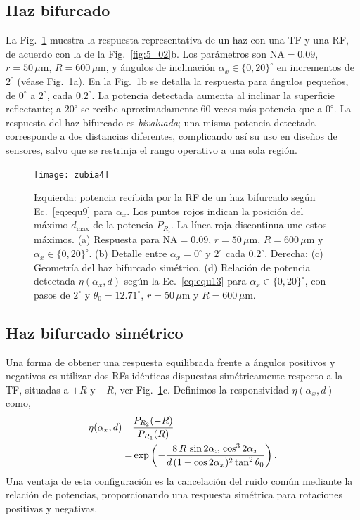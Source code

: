 \documentclass[11pt,a4paper]{article}
\begin{document}
\begin{multicols}{2}
\subsection{Haz bifurcado}\label{sec:5_02_01}
La Fig.~\ref{fig:5_04} muestra la respuesta representativa de un haz con una TF y una RF, de acuerdo con la de la Fig.~\ref{fig:5_02}b. Los parámetros son $\text{NA}=0.09$, $r=50\,\mu\text{m}$, $R=600\,\mu\text{m}$, y ángulos de inclinación $\alpha_x\in\{0,20\}^\circ$ en incrementos de $2^\circ$ (véase Fig.~\ref{fig:5_04}a). En la Fig.~\ref{fig:5_04}b se detalla la respuesta para ángulos pequeños, de $0^\circ$ a $2^\circ$, cada $0.2^\circ$.
La potencia detectada aumenta al inclinar la superficie reflectante; a $20^\circ$ se recibe aproximadamente 60 veces más potencia que a $0^\circ$. La respuesta del haz bifurcado es \emph{bivaluada}; una misma potencia detectada corresponde a dos distancias diferentes, complicando así su uso en diseños de sensores, salvo que se restrinja el rango operativo a una sola región.
\begin{figure}[t]
    \centering
    \texttt{[image: zubia4]}
    \caption{%
        Izquierda: potencia recibida por la RF de un haz bifurcado según Ec.~\eqref{eq:equ9} para $\alpha_x$. Los puntos rojos indican la posición del máximo $d_{\text{max}}$ de la potencia $P_{R_i}$. La línea roja discontinua une estos máximos. (a) Respuesta para $\text{NA}=0.09$, $r=50\,\mu$m, $R=600\,\mu$m y $\alpha_x\in\{0,20\}^\circ$. (b) Detalle entre $\alpha_x=0^\circ$ y $2^\circ$ cada $0.2^\circ$. Derecha: (c) Geometría del haz bifurcado simétrico. (d) Relación de potencia detectada $\eta(\alpha_x,d)$ según la Ec.~\eqref{eq:equ13} para $\alpha_x\in\lbrace0,20\rbrace^\circ$, con pasos de $2^\circ$ y $\theta_0=12.71^\circ$, $r=50\,\mu\text{m}$ y $R=600\,\mu\text{m}$.}
    \label{fig:5_04}
\end{figure}
\subsection{Haz bifurcado simétrico}\label{sec:5_02_02}
Una forma de obtener una respuesta equilibrada frente a ángulos positivos y negativos es utilizar dos RFs idénticas dispuestas simétricamente respecto a la TF, situadas a $+R$ y $-R$, ver Fig.~\ref{fig:5_04}c. Definimos la responsividad $\eta(\alpha_x,d)$ como,
\begin{align}
    \eta(\alpha_x,d) =& \frac{P_{R_2}(-R)}{P_{R_1}(R)}
    =\notag\\
    =&\exp\left(-\frac{8\,R\,\sin 2\alpha_x\,\cos^3 2\alpha_x}{d\,(1+\cos 2\alpha_x)^2\tan^2\theta_0}\right).
    \label{eq:equ13}
\end{align}
Una ventaja de esta configuración es la cancelación del ruido común mediante la relación de potencias, proporcionando una respuesta simétrica para rotaciones positivas y negativas.
%
%

\end{multicols}
\end{document}
